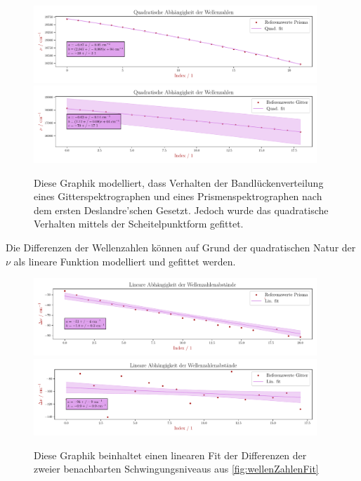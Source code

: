 \documentclass[12pt,english,ngerman]{scrartcl}
\begin{document}
\begin{figure}[H]
	\begin{center}
		\includegraphics[width=0.95\textwidth]{figures/waveNumberFitPrisma.pdf}
		\includegraphics[width=0.95\textwidth]{figures/waveNumberFitGitter.pdf}
	\end{center}
	\caption{Diese Graphik modelliert, dass Verhalten der Bandlückenverteilung eines Gitterspektrographen
		und eines Prismenspektrographen nach dem ersten Deslandre'schen Gesetzt. Jedoch 
		wurde das quadratische Verhalten mittels der Scheitelpunktform gefittet.
	}\label{fig:wellenZahlenFit}
\end{figure}

Die Differenzen der Wellenzahlen können auf Grund der quadratischen Natur der
$\nu$ als lineare Funktion modelliert und gefittet werden.

\begin{figure}[H]
	\begin{center}
		\includegraphics[width=0.95\textwidth]{figures/waveNumberDeltasFitPrisma.pdf}
		\includegraphics[width=0.95\textwidth]{figures/waveNumberDeltasFitGitter.pdf}
	\end{center}
	\caption{Diese Graphik beinhaltet einen linearen Fit der Differenzen der
		zweier benachbarten Schwingungsniveaus aus \autoref{fig:wellenZahlenFit}
	}\label{fig:wellenZahlenDeltaFit}

\end{figure}
\end{document}
